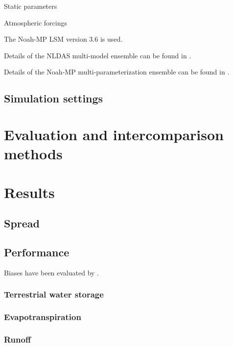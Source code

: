 \documentclass[essd]{copernicus}
\begin{document}
Static parameters

Atmospheric forcings

The Noah-MP LSM version 3.6 is used.

Details of the NLDAS multi-model ensemble can be found in \citet{xia2012JGRA,
xia2012JGRAa, fei2021WRR}.

Details of the Noah-MP multi-parameterization ensemble can be found in
\citet{zheng2019WRR, zheng2020JAMES, fei2021WRR}.


\subsection{Simulation settings}\label{sec:data:simulation}


\section{Evaluation and intercomparison methods}\label{sec:evaluation}


\section{Results} \label{sec:result}

\subsection{Spread}

\subsection{Performance}

Biases have been evaluated by \citet{zheng2020JAMES}.

\subsubsection{Terrestrial water storage}

\citep{landerer2012WRR}


\subsubsection{Evapotranspiration}

\subsubsection{Runoff}


 \label{sec:availability}
\end{document}
